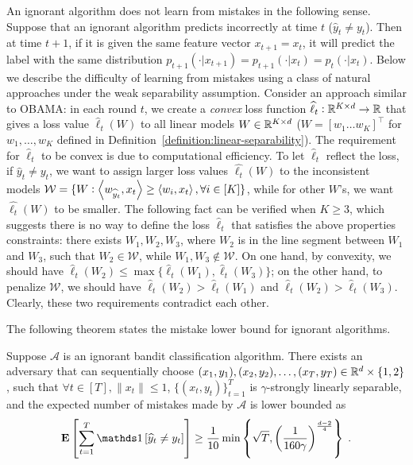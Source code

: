 An ignorant algorithm does not learn from mistakes in the following sense.
Suppose that an ignorant algorithm predicts incorrectly at time $t$ ($\widehat
y_t \neq y_t$). Then at time $t+1$, if it is given the same feature vector
$x_{t+1}=x_t$, it will predict the label with the same distribution
$p_{t+1}(\cdot|x_{t+1})=p_{t+1}(\cdot|x_t)=p_t(\cdot|x_t)$. Below we describe
the difficulty of learning from mistakes using a class of natural approaches
under the weak separability assumption. Consider an approach similar to OBAMA:
in each round $t$, we create a \textit{convex} loss function $\widehat \ell_t:
\mathbb{R}^{K\times d} \to \mathbb{R}$ that gives a loss value $\widehat
\ell_t(W)$ to all linear models $W \in \mathbb{R}^{K\times d}$ ($W=[w_1 \ldots
w_K]^\top$ for $w_1, \ldots, w_K$ defined in
Definition~\ref{definition:linear-separability}). The requirement for
$\widehat{\ell}_t$ to be convex is due to computational efficiency. To let
$\widehat{\ell}_t$ reflect the loss, if $\widehat y_t \neq y_t$, we want to
assign larger loss values $\widehat{\ell_t}(W)$ to the inconsistent models
$\mathcal{W}=\{W: \left\langle w_{\widehat y_t}, x_t \right\rangle \ge \left\langle w_i, x_t \right\rangle, \forall
i\in[K]\}$, while for other $W$'s, we want $\widehat{\ell_t}(W)$ to be smaller.
The following fact can be verified when $K\ge 3$, which suggests there is no
way to define the loss $\widehat \ell_t$ that satisfies the above properties
constraints: there exists $W_1, W_2, W_3$, where $W_2$ is in the line segment
between $W_1$ and $W_3$, such that $W_2\in \mathcal{W}$, while $W_1, W_3 \notin
\mathcal{W}$. On one hand, by convexity, we should have
$\widehat{\ell}_t(W_2)\le \max\{\widehat{\ell}_t(W_1),
\widehat{\ell}_t(W_3)\}$; on the other hand, to penalize $\mathcal{W}$, we
should have $\widehat{\ell}_t(W_2) > \widehat{\ell}_t(W_1)$ and
$\widehat{\ell}_t(W_2) > \widehat{\ell}_t(W_3)$. Clearly, these two requirements
contradict each other.

The following theorem states the mistake lower bound for ignorant algorithms.

\begin{theorem}
\label{theorem:ignorant_lower_bound}
Suppose $\mathcal{A}$ is an ignorant bandit classification algorithm. There
exists an adversary that can sequentially choose $(x_1, y_1), (x_2, y_2),
\ldots, (x_T, y_T) \in \mathbb{R}^d\times \{1,2\}$, such that $\forall t\in[T],
\|x_t\|\le 1$, $\{(x_t, y_t)\}_{t=1}^T$ is $\gamma$-strongly linearly
separable, and the expected number of mistakes made by $\mathcal{A}$ is lower
bounded as
\begin{align*}
\Exp\left[ \sum_{t=1}^T \indicator{\widehat y_t \neq y_t} \right]
\ge \frac{1}{10}\min\left\{\sqrt{T}, \left(\frac{1}{160\gamma}\right)^{\frac{d-2}{4}} \right\} \; .
\end{align*}
\end{theorem}

